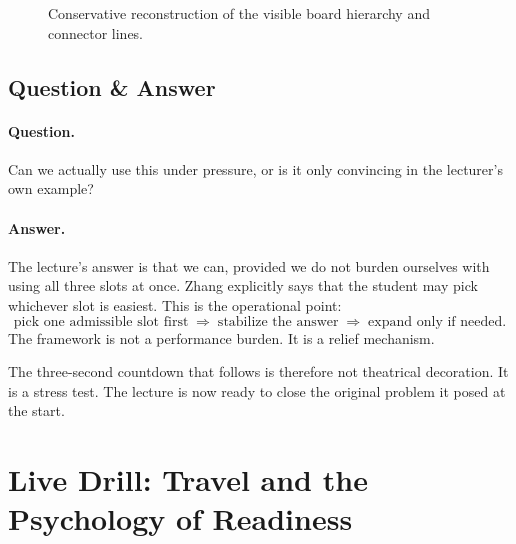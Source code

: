 \begin{figure}[h]
\centering
{}
\caption{Conservative reconstruction of the visible board hierarchy and connector lines.}
\end{figure}

\subsection{Question \& Answer}

\paragraph{Question.} Can we actually use this under pressure, or is it only convincing in the lecturer’s own example?

\paragraph{Answer.} The lecture’s answer is that we can, provided we do not burden ourselves with using all three slots at once. Zhang explicitly says that the student may pick whichever slot is easiest. This is the operational point:
\begin{equation}
\text{pick one admissible slot first}
\;\Rightarrow\;
\text{stabilize the answer}
\;\Rightarrow\;
\text{expand only if needed}.
\end{equation}
The framework is not a performance burden. It is a relief mechanism.

The three-second countdown that follows is therefore not theatrical decoration. It is a stress test. The lecture is now ready to close the original problem it posed at the start.

\section{Live Drill: Travel and the Psychology of Readiness}

